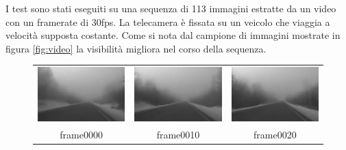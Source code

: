 \documentclass[12pt]{report}
\begin{document}
\noindent I test sono stati eseguiti su una sequenza di 113 immagini estratte da un video con un framerate di 30fps. La telecamera \`e fissata su un veicolo che viaggia a velocit\`a supposta costante. Come si nota dal campione di immagini mostrate in figura \ref{fig:video} la visibilit\`a migliora nel corso della sequenza.

\newcommand{\videoScale}{0.5}
\begin{figure}[H]
\centering
\begin{tabular}{ccc}
	\includegraphics[scale=\videoScale]{images/frame0000.jpg} & \includegraphics[scale=\videoScale]{images/frame0010.jpg} & \includegraphics[scale=\videoScale]{images/frame0020.jpg}\\
	frame0000 & frame0010 & frame0020 \\

\end{tabular}
\end{figure}
\end{document}
